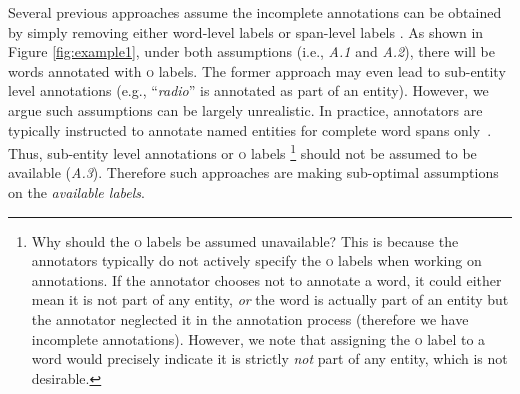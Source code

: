 Several previous approaches assume the incomplete annotations can be obtained by simply removing either word-level labels \cite{fernandes2011learning} or span-level labels \cite{carlson2009learning}. 
As shown in Figure \ref{fig:example1}, under both assumptions (i.e., {\it A.1} and {\it A.2}), there will be words annotated with \textsc{o} labels. The former approach may even lead to sub-entity level annotations (e.g., ``{\em radio}'' is annotated as part of an entity).
However, we argue such assumptions can be largely unrealistic.
In practice, annotators are typically instructed to annotate named entities for complete word spans only~\cite{settles2008active,surdeanu2010legal}.
Thus, sub-entity level annotations or \textsc{o} labels \footnote{Why should the \textsc{o} labels be assumed unavailable? This is because  the annotators typically do not actively specify the \textsc{o} labels when working on annotations. If the annotator chooses not to annotate a word, it could either mean it is not part of any entity, {\em or} the word is actually part of an entity but the annotator neglected it in the annotation process (therefore we have incomplete annotations). However, we note that assigning the \textsc{o} label to a word would precisely indicate it is strictly {\em not} part of any entity, which is not desirable.} should not be assumed to be available ({\it A.3}).
Therefore such approaches are making sub-optimal assumptions on the {\em available labels}.






